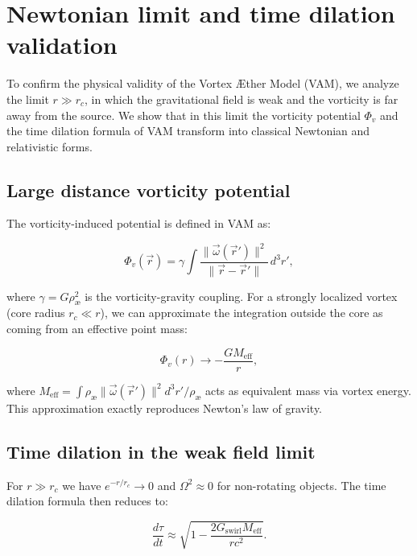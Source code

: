 \section{Newtonian limit and time dilation validation}\label{sec:appendix:3}

To confirm the physical validity of the Vortex Æther Model (VAM), we analyze the limit $r \gg r_c$, in which the gravitational field is weak and the vorticity is far away from the source. We show that in this limit the vorticity potential $\Phi_v$ and the time dilation formula of VAM transform into classical Newtonian and relativistic forms.

\subsection{Large distance vorticity potential}

The vorticity-induced potential is defined in VAM as:

\begin{equation}
    \Phi_v(\vec{r}) = \gamma \int \frac{\|\vec{\omega}(\vec{r}')\|^2}{\|\vec{r} - \vec{r}'\|} \, d^3r',
\end{equation}

where $\gamma = G \rho_\text{æ}^2$ is the vorticity-gravity coupling. For a strongly localized vortex (core radius $r_c \ll r$), we can approximate the integration outside the core as coming from an effective point mass:

\begin{equation}
    \Phi_v(r) \to -\frac{G M_\text{eff}}{r},
\end{equation}

where $M_\text{eff} = \int \rho_\text{æ} \|\vec{\omega}(\vec{r}')\|^2 d^3r' / \rho_\text{æ}$ acts as equivalent mass via vortex energy. This approximation exactly reproduces Newton's law of gravity.

\subsection{Time dilation in the weak field limit}

For $r \gg r_c$ we have $e^{-r/r_c} \to 0$ and $\Omega^2 \approx 0$ for non-rotating objects. The time dilation formula then reduces to:

\begin{equation}
    \frac{d\tau}{dt} \approx \sqrt{1 - \frac{2 G_\text{swirl} M_\text{eff}}{r c^2}}.
\end{equation}

